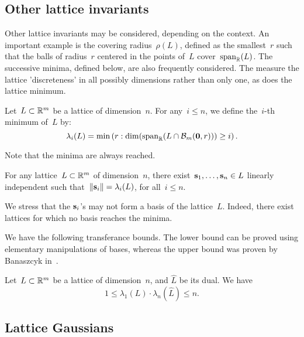 \begin{comment}
r^{m} (2pie/m)^(m/2) (1+sqrt(m/2)/r)^m q^(n-m) \leq 2^(-m)
r +sqrt(m/2) <= q^(1-n/m) * sqrt(m/8pie)
\end{comment}

\subsection{Other lattice invariants}

Other lattice invariants may be considered, depending on the context. An important example is the covering radius~$\rho(L)$, 
defined as the smallest~$r$ such that the balls of radius~$r$ centered in the points of~$L$ cover~$\mbox{span}_{\mathbb{R}}(L)$.
The successive minima, defined below, are also frequently considered. The measure the lattice 'discreteness' in all possibly dimensions
rather than only one, as does the lattice minimum. 

\begin{definition}
Let~$L \subset \mathbb{R}^m$ be a lattice of dimension~$n$. For any~$i \leq n$, we define the~$i$-th minimum of~$L$ by:
\[
\lambda_i(L) = \min \left( r: \dim(\mbox{span}_{\mathbb{R}}( L \cap \mathcal{B}_m ({\bf 0}, r))) \geq i \right). 
\]
\end{definition}

Note that the minima are always reached. 

\begin{lemma}
For any lattice~$L \subset \mathbb{R}^m$ of dimension~$n$, there exist~${\bf s}_1, \ldots, {\bf s}_n \in L$ linearly independent such that~$\|{\bf s}_i\| = \lambda_i(L)$, for all~$i \leq n$. 
\end{lemma}

We stress that the ${\bf s}_i$'s may not form a basis of the lattice~$L$. Indeed, there exist lattices for which no basis reaches 
the minima. 

We have the following transferance bounds. The lower bound can be proved using elementary manipulations of bases, 
whereas the upper bound was proven by Banaszcyk in~\cite{Bana93}. 

\begin{theorem}
Let~$L \subset \mathbb{R}^m$ be a lattice of dimension~$n$, and $\widehat{L}$ be its dual. We have
\[ 
1 \leq \lambda_1(L) \cdot  \lambda_n(\widehat{L}) \leq n. 
\]
\end{theorem}

\subsection{Lattice Gaussians}


